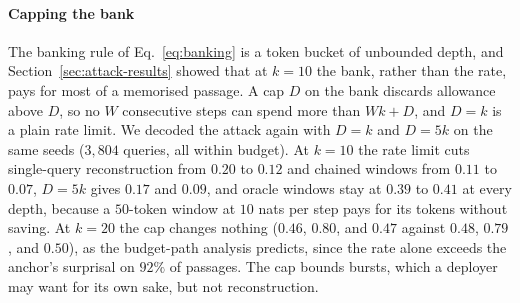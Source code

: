 \paragraph{Capping the bank}
The banking rule of Eq.~\eqref{eq:banking} is a token bucket of unbounded depth, and Section~\ref{sec:attack-results} showed that at $k=10$ the bank, rather than the rate, pays for most of a memorised passage. A cap $D$ on the bank discards allowance above $D$, so no $W$ consecutive steps can spend more than $Wk + D$, and $D = k$ is a plain rate limit. We decoded the attack again with $D = k$ and $D = 5k$ on the same seeds ($3{,}804$ queries, all within budget). At $k=10$ the rate limit cuts single-query reconstruction from $0.20$ to $0.12$ and chained windows from $0.11$ to $0.07$, $D = 5k$ gives $0.17$ and $0.09$, and oracle windows stay at $0.39$ to $0.41$ at every depth, because a $50$-token window at $10$ nats per step pays for its tokens without saving. At $k=20$ the cap changes nothing ($0.46$, $0.80$, and $0.47$ against $0.48$, $0.79$, and $0.50$), as the budget-path analysis predicts, since the rate alone exceeds the anchor's surprisal on $92\%$ of passages. The cap bounds bursts, which a deployer may want for its own sake, but not reconstruction.


